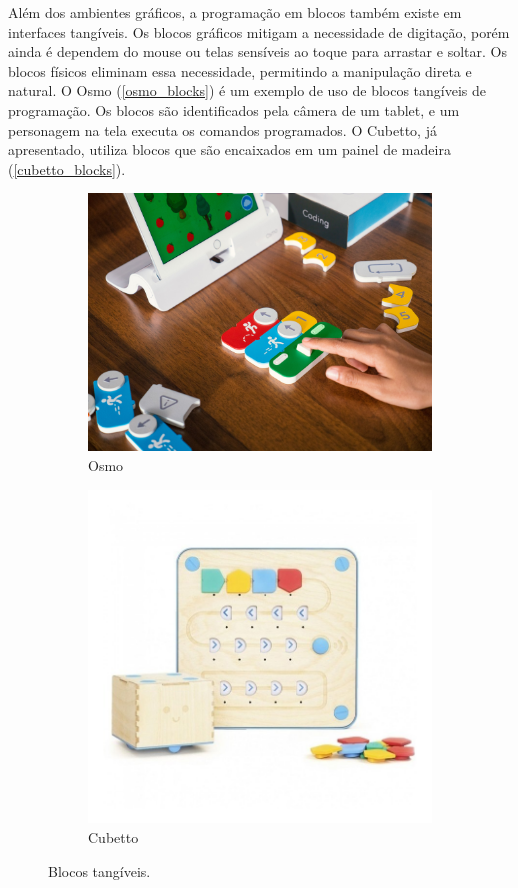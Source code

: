 Além dos ambientes gráficos, a programação em blocos também existe em interfaces tangíveis. Os blocos gráficos mitigam a necessidade de digitação, porém ainda é dependem do mouse ou telas sensíveis ao toque para arrastar e soltar. Os blocos físicos eliminam essa necessidade, permitindo a manipulação direta e natural. O Osmo (\autoref{osmo_blocks}) é um exemplo de uso de blocos tangíveis de programação. Os blocos são identificados pela câmera de um tablet, e um personagem na tela executa os comandos programados. O Cubetto, já apresentado, utiliza blocos que são encaixados em um painel de madeira (\autoref{cubetto_blocks}).

\begin{figure}[!htbp]
    \centering
    \begin{subfigure}{.56\textwidth}
        \centering
        \includegraphics[width=.9\linewidth,fbox]{figs/osmo.jpg}
        \caption{Osmo}
        \label{osmo_blocks}
    \end{subfigure}%
    \begin{subfigure}{.43\textwidth}
        \centering
        \includegraphics[width=.9\linewidth,fbox]{figs/cubetto.jpg}
        \caption{Cubetto}
        \label{cubetto_blocks}
    \end{subfigure}
    \caption{Blocos tangíveis.}
    \sourceauthor
    \label{tangible_blocks}
\end{figure}


